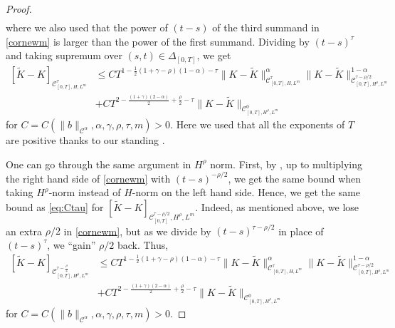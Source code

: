 \documentclass[11pt,a4paper]{article}
\newcommand{\C}{\mathcal{C}}
\newcommand{\cC}{\mathcal{C}}
\newcommand{\wt}{\widetilde}
\renewcommand{\le}{\leqslant}
\newcommand{\nn}{\nonumber}
\numberwithin{equation}{section}
\let\cref\crtcref
\theoremstyle{definition}
\theoremstyle{remark}
\theoremstyle{plain}
\begin{document}
\begin{proof}
\begin{align*}
\end{align*}
where we also used that the power of $(t-s)$ of the third summand in \eqref{cornewm} is larger than the power of the first summand.
Dividing by $(t-s)^\tau$ and taking supremum over $(s,t)\in\Delta_{[0,T]}$, we get
\begin{align} \label{eq:Ctau}
[\wt{K}-K]_{\mathcal{C}^{\tau}_{[0,T],H,L^m}}&\le C T^{1-\frac12 (1+\gamma-\rho)(1-\alpha)-\tau}\|K-\wt{K}\|_{\cC^\tau_{[0,T],H,L^m}}^{\alpha}\|K-\wt{K}\|_{\cC^{\tau-\rho/2}_{[0,T],H^
\rho,L^m}}^{1-\alpha}\nonumber\\
&+C  T^{2-\frac{(1+\gamma)(2-\alpha)}{2}+\frac\rho2-\tau}  \|K-\wt{K}\|_{\cC^0_{[0,T],H^\rho,L^m}}
\end{align}
for $C=C(\|b\|_{\C^\alpha},\alpha,\gamma,\rho,\tau,m)>0$.
Here we used that all the exponents of $T$ are positive thanks to our standing \cref{a:manyineq}.



 One can go through the same argument in $H^\rho$ norm. First, by \cref{c:comparison}, up to multiplying the right hand side of \eqref{cornewm} with $(t-s)^{-\rho/2}$, we get the same bound when taking $H^\rho$-norm instead of $H$-norm on the left hand side. Hence, we get the same bound as \eqref{eq:Ctau} for $[\wt{K}-K]_{\cC^{\tau-\rho/2}_{[0,T]},H^\rho,L^m}$. Indeed, as mentioned above, we lose an extra $\rho/2$ in \eqref{cornewm}, but as we divide by $(t-s)^{\tau-\rho/2}$ in place of $(t-s)^\tau$, we ``gain'' $\rho/2$ back. Thus,
\begin{align} \label{mixed}
[\wt{K}-K]_{\mathcal{C}^{\tau-\frac\rho2}_{[0,T],H^\rho,L^m}}&\le C T^{1-\frac12 (1+\gamma-\rho)(1-\alpha)-\tau}\|K-\wt{K}\|_{\cC^\tau_{[0,T],H,L^m}}^{\alpha}\|K-\wt{K}\|_{\cC^{\tau-\rho/2}_{[0,T],H^
\rho,L^m}}^{1-\alpha}\nn\\
&+C  T^{2-\frac{(1+\gamma)(2-\alpha)}{2}+\frac\rho2-\tau}  \|K-\wt{K}\|_{\cC^0_{[0,T],H^\rho,L^m}}
\end{align}
for $C=C(\|b\|_{\C^\alpha},\alpha,\gamma,\rho,\tau,m)>0$.


\end{proof}
\end{document}
